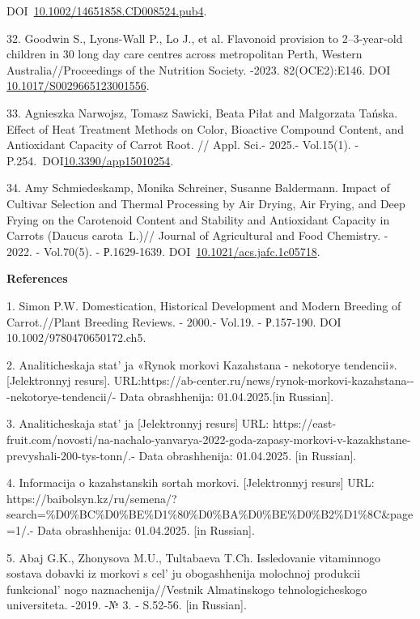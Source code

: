 DOI~\href{https://doi.org/10.1002/14651858.cd008524.pub4}{10.1002/14651858.CD008524.pub4}.

32. Goodwin S., Lyons-Wall P., Lo J., et al. Flavonoid provision to
2--3-year-old children in 30 long day care centres across metropolitan
Perth, Western Australia//Proceedings of the Nutrition Society. -2023.
82(OCE2):E146. DOI
\href{http://dx.doi.org/10.1017/S0029665123001556}{10.1017/S0029665123001556}.

33. Agnieszka Narwojsz, Tomasz Sawicki, Beata Piłat and Małgorzata
Tańska. Effect of Heat Treatment Methods on Color, Bioactive Compound
Content, and Antioxidant Capacity of Carrot Root. // Appl. Sci.- 2025.-
Vol.15(1). -
P.254.~DOI\href{http://dx.doi.org/10.3390/app15010254}{10.3390/app15010254}.

34. Amy Schmiedeskamp, Monika Schreiner, Susanne Baldermann. Impact of
Cultivar Selection and Thermal Processing by Air Drying, Air Frying, and
Deep Frying on the Carotenoid Content and Stability and Antioxidant
Capacity in Carrots (Daucus carota~L.)// Journal of Agricultural and
Food Chemistry. - 2022. - Vol.70(5). - Р.1629-1639.
DOI~\href{https://doi.org/10.1021/acs.jafc.1c05718}{10.1021/acs.jafc.1c05718}.

{\bfseries References}

1. Simon P.W. Domestication, Historical Development and Modern Breeding
of Carrot.//Plant Breeding Reviews. - 2000.- Vol.19. - Р.157-190. DOI
10.1002/9780470650172.ch5.

2. Analiticheskaja stat' ja «Rynok morkovi Kazahstana -
nekotorye tendencii». {[}Jelektronnyj resurs{]}.
URL:https://ab-center.ru/news/rynok-morkovi-kazahstana-\/-\/-nekotorye-tendencii/-
Data obrashhenija: 01.04.2025.{[}in Russian{]}.

3. Analiticheskaja stat' ja {[}Jelektronnyj resurs{]}
URL:
https://east-fruit.com/novosti/na-nachalo-yanvarya-2022-goda-zapasy-morkovi-v-kazakhstane-prevyshali-200-tys-tonn/.-
Data obrashhenija: 01.04.2025. {[}in Russian{]}.

4. Informacija o kazahstanskih sortah morkovi. {[}Jelektronnyj resurs{]}
URL:
https://baibolsyn.kz/ru/semena/?search=\%D0\%BC\%D0\%BE\%D1\%80\%D0\%BA\%D0\%BE\%D0\%B2\%D1\%8C\&page=1/.-
Data obrashhenija: 01.04.2025. {[}in Russian{]}.

5. Abaj G.K., Zhonysova M.U., Tultabaeva T.Ch. Issledovanie vitaminnogo
sostava dobavki iz morkovi s cel' ju obogashhenija
molochnoj produkcii funkcional' nogo
naznachenija//Vestnik Almatinskogo tehnologicheskogo universiteta.
-2019. -№ 3. - S.52-56. {[}in Russian{]}.

